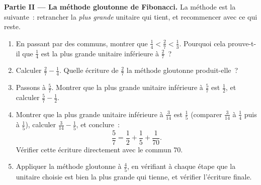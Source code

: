\begin{problem}
\medskip
\noindent\textbf{Partie II --- La méthode gloutonne de Fibonacci.}
La méthode est la suivante~: retrancher la \emph{plus grande}
 unitaire qui tient, et recommencer avec ce qui reste.
\begin{enumerate}[resume]
  \item En passant par des  communs, montrer que
        $\frac14 < \frac27 < \frac13$. Pourquoi cela prouve-t-il que
        $\frac14$ est la plus grande  unitaire inférieure à
        $\frac27$~?
  \item Calculer $\frac27 - \frac14$. Quelle écriture de $\frac27$
        la méthode gloutonne produit-elle~?
  \item Passons à $\frac57$. Montrer que la plus grande 
        unitaire inférieure à $\frac57$ est $\frac12$, et calculer
        $\frac57 - \frac12$.
  \item Montrer que la plus grande  unitaire inférieure à
        $\frac{3}{14}$ est $\frac15$ (comparer $\frac{3}{14}$ à
        $\frac14$ puis à $\frac15$), calculer
        $\frac{3}{14} - \frac15$, et conclure~:
        \[
        \frac57 = \frac12 + \frac15 + \frac{1}{70} .
        \]
        Vérifier cette écriture directement avec le 
        commun $70$.
  \item Appliquer la méthode gloutonne à $\frac45$, en vérifiant à
        chaque étape que la  unitaire choisie est bien la
        plus grande qui tienne, et vérifier l'écriture finale.
\end{enumerate}


\end{problem}
